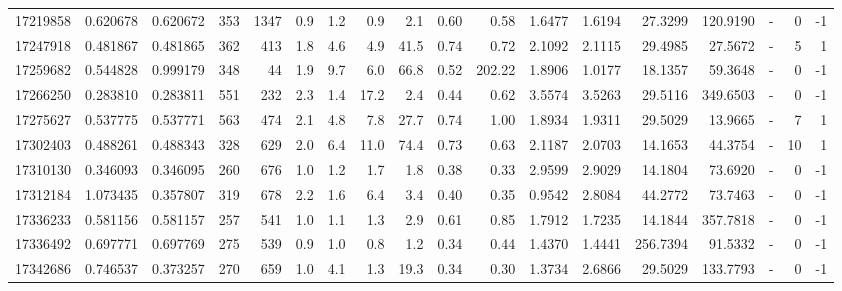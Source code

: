 \begin{tabular}{rrrrrrrrrrrrrrrlrr}
  17219858 & 0.620678 &   0.620672 &  353 & 1347 &      0.9 &      1.2 &     0.9 &      2.1 &       0.60 &        0.58 &  1.6477 &  1.6194 &   27.3299 &  120.9190 &             - &        0 &         -1 \\
  17247918 & 0.481867 &   0.481865 &  362 &  413 &      1.8 &      4.6 &     4.9 &     41.5 &       0.74 &        0.72 &  2.1092 &  2.1115 &   29.4985 &   27.5672 &             - &        5 &          1 \\
  17259682 & 0.544828 &   0.999179 &  348 &   44 &      1.9 &      9.7 &     6.0 &     66.8 &       0.52 &      202.22 &  1.8906 &  1.0177 &   18.1357 &   59.3648 &             - &        0 &         -1 \\
  17266250 & 0.283810 &   0.283811 &  551 &  232 &      2.3 &      1.4 &    17.2 &      2.4 &       0.44 &        0.62 &  3.5574 &  3.5263 &   29.5116 &  349.6503 &             - &        0 &         -1 \\
  17275627 & 0.537775 &   0.537771 &  563 &  474 &      2.1 &      4.8 &     7.8 &     27.7 &       0.74 &        1.00 &  1.8934 &  1.9311 &   29.5029 &   13.9665 &             - &        7 &          1 \\
  17302403 & 0.488261 &   0.488343 &  328 &  629 &      2.0 &      6.4 &    11.0 &     74.4 &       0.73 &        0.63 &  2.1187 &  2.0703 &   14.1653 &   44.3754 &             - &       10 &          1 \\
  17310130 & 0.346093 &   0.346095 &  260 &  676 &      1.0 &      1.2 &     1.7 &      1.8 &       0.38 &        0.33 &  2.9599 &  2.9029 &   14.1804 &   73.6920 &             - &        0 &         -1 \\
  17312184 & 1.073435 &   0.357807 &  319 &  678 &      2.2 &      1.6 &     6.4 &      3.4 &       0.40 &        0.35 &  0.9542 &  2.8084 &   44.2772 &   73.7463 &             - &        0 &         -1 \\
  17336233 & 0.581156 &   0.581157 &  257 &  541 &      1.0 &      1.1 &     1.3 &      2.9 &       0.61 &        0.85 &  1.7912 &  1.7235 &   14.1844 &  357.7818 &             - &        0 &         -1 \\
  17336492 & 0.697771 &   0.697769 &  275 &  539 &      0.9 &      1.0 &     0.8 &      1.2 &       0.34 &        0.44 &  1.4370 &  1.4441 &  256.7394 &   91.5332 &             - &        0 &         -1 \\
  17342686 & 0.746537 &   0.373257 &  270 &  659 &      1.0 &      4.1 &     1.3 &     19.3 &       0.34 &        0.30 &  1.3734 &  2.6866 &   29.5029 &  133.7793 &             - &        0 &         -1 \\

\end{tabular}

